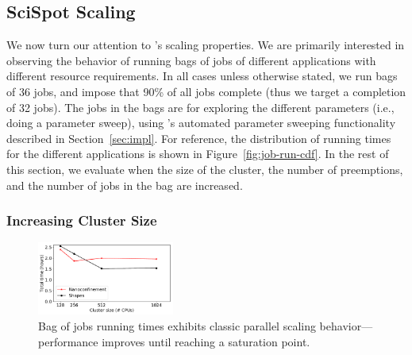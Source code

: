 \subsection{SciSpot Scaling}
We now turn our attention to \sysname's scaling properties. We are primarily interested in observing the behavior of running bags of jobs of different applications with different resource requirements.
In all cases unless otherwise stated, we run bags of 36 jobs, and impose that 90\% of all jobs complete (thus we target a completion of 32 jobs).
The jobs in the bags are for exploring the different parameters (i.e., doing a parameter sweep), using \sysname's automated parameter sweeping functionality described in Section~\ref{sec:impl}. For reference, the distribution of running times for the different applications is shown in Figure~\ref{fig:job-run-cdf}. 
In the rest of this section, we evaluate \sysname when the size of the cluster, the number of preemptions, and the number of jobs in the bag are increased.


\subsubsection{Increasing Cluster Size} 

\begin{figure}
  \includegraphics[width=0.4\textwidth]{../graphs/vm-per-job-scaling.pdf}
      \vspace*{\myfigspace}
  \caption{Bag of jobs running times exhibits classic parallel scaling behavior---performance improves until reaching a saturation point.}
  \label{fig:vm-per-job-scaling}
    \vspace*{\myfigspace}
\end{figure}

